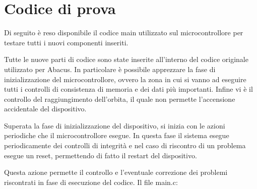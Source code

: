 \documentclass[LaM,binding=0.6cm,oneside]{../sapthesis}
\begin{document}
\section{Codice di prova}
Di seguito è reso disponibile il codice main utilizzato sul microcontrollore per testare tutti i nuovi componenti inseriti. 

Tutte le nuove parti di codice sono state inserite all'interno del codice originale utilizzato per Abacus. In particolare è possibile apprezzare la fase di inizializzazione del microcontrollore, ovvero la zona in cui si vanno ad eseguire tutti i controlli di consistenza di memoria e dei dati più importanti. Infine vi è il controllo del raggiungimento dell'orbita, il quale non permette l'accensione accidentale del dispositivo.

Superata la fase di inizializzazione del dispositivo, si inizia con le azioni periodiche che il microcontrollore esegue. In questa fase il sistema esegue periodicamente dei controlli di integrità e nel caso di riscontro di un problema esegue un reset, permettendo di fatto il restart del dispositivo. 

Questa azione permette il controllo e l'eventuale correzione dei problemi riscontrati in fase di esecuzione del codice.
\newline\newline
Il file main.c:
\end{document}
